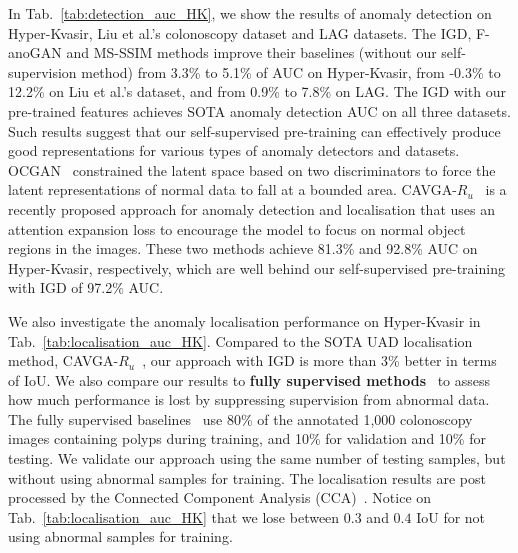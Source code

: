 \documentclass[runningheads]{llncs}
\begin{document}
In Tab.~\ref{tab:detection_auc_HK}, we show the results of anomaly detection on Hyper-Kvasir, Liu et al.'s colonoscopy dataset and LAG datasets. 
The IGD, F-anoGAN and MS-SSIM methods improve their baselines (without our self-supervision method) from 3.3\% to  5.1\% of AUC on Hyper-Kvasir, from -0.3\% to 12.2\% on Liu et al.'s dataset, and from 0.9\% to 7.8\% on LAG. 
The IGD with our pre-trained features achieves SOTA anomaly detection AUC on all three datasets. Such results suggest that our self-supervised pre-training can effectively produce good representations for various types of anomaly detectors and datasets.  
OCGAN~\cite{perera2019ocgan} constrained the latent space based on two discriminators to force the latent representations of normal data to fall at a bounded area. CAVGA-$R_{u}$~\cite{venkataramanan2020attention} is a recently proposed approach for anomaly detection and localisation that uses an attention expansion loss to encourage the model to focus on normal object regions in the images. 
These two methods achieve 81.3\% and 92.8\% AUC on Hyper-Kvasir, respectively, which are well behind our self-supervised pre-training with IGD of 97.2\% AUC. 


We also investigate the anomaly localisation performance on Hyper-Kvasir in Tab.~\ref{tab:localisation_auc_HK}.
Compared to the SOTA UAD localisation method, CAVGA-$R_{u}$~\cite{venkataramanan2020attention}, our approach with IGD is more than 3\% better in terms of IoU.
We also compare our results to \textbf{fully supervised methods}~\cite{ronneberger2015u,zhou2018unet++,diakogiannis2020resunet,fang2019selective} to assess how much performance is lost by suppressing supervision from abnormal data.
The fully supervised baselines~\cite{ronneberger2015u,zhou2018unet++,diakogiannis2020resunet,fang2019selective} use 80\% of the annotated 1,000 colonoscopy images containing polyps during training, and 10\% for validation and 10\% for testing. 
We validate our approach using the same number of testing samples, but without using abnormal samples for training. 
The localisation results are post processed by the Connected Component Analysis (CCA)~\cite{chai1999significance}.
Notice on Tab.~\ref{tab:localisation_auc_HK} that we lose between $0.3$ and $0.4$ IoU for not using  abnormal samples for training.
\end{document}

